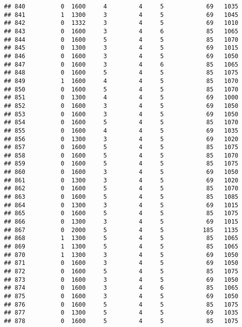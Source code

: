 \documentclass[]{article}
\begin{document}
\begin{verbatim}
## 840          0  1600     4         4     5            69   1035
## 841          1  1300     3         4     5            69   1045
## 842          0  1332     3         4     5            69   1010
## 843          0  1600     3         4     6            85   1065
## 844          0  1600     5         4     5            85   1070
## 845          0  1300     3         4     5            69   1015
## 846          0  1600     3         4     5            69   1050
## 847          0  1600     3         4     6            85   1065
## 848          0  1600     5         4     5            85   1075
## 849          1  1600     4         4     5            85   1070
## 850          0  1600     5         4     5            85   1070
## 851          0  1300     4         4     5            69   1000
## 852          0  1600     3         4     5            69   1050
## 853          0  1600     3         4     5            69   1050
## 854          0  1600     5         4     5            85   1070
## 855          0  1600     4         4     5            69   1035
## 856          0  1300     3         4     5            69   1020
## 857          0  1600     5         4     5            85   1075
## 858          0  1600     5         4     5            85   1070
## 859          0  1600     5         4     5            85   1075
## 860          0  1600     3         4     5            69   1050
## 861          0  1300     3         4     5            69   1020
## 862          0  1600     5         4     5            85   1070
## 863          0  1600     5         4     5            85   1085
## 864          0  1300     3         4     5            69   1015
## 865          0  1600     5         4     5            85   1075
## 866          0  1300     3         4     5            69   1015
## 867          0  2000     5         4     5           185   1135
## 868          1  1300     5         4     5            85   1065
## 869          1  1300     5         4     5            85   1065
## 870          1  1300     3         4     5            69   1050
## 871          0  1600     3         4     5            69   1050
## 872          0  1600     5         4     5            85   1075
## 873          0  1600     3         4     5            69   1050
## 874          0  1600     3         4     6            85   1065
## 875          0  1600     3         4     5            69   1050
## 876          0  1600     5         4     5            85   1075
## 877          0  1300     5         4     5            69   1035
## 878          0  1600     5         4     5            85   1075

\end{verbatim}
\end{document}
